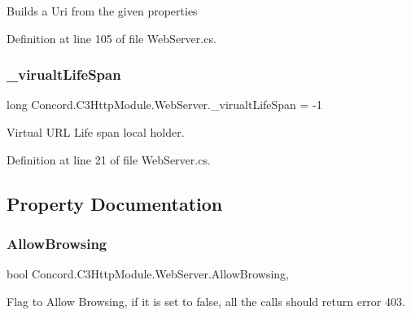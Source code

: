 Builds a Uri from the given properties 



Definition at line 105 of file Web\+Server.\+cs.

\mbox{\label{class_concord_1_1_c3_http_module_1_1_web_server_adbb7b3ec87d6021801930c29b21e6ef5}} 
\subsubsection{\texorpdfstring{\_virualtLifeSpan}{\_virualtLifeSpan}}
{\footnotesize\ttfamily long Concord.\+C3\+Http\+Module.\+Web\+Server.\+\_\+virualt\+Life\+Span = -\/1\hspace{0.3cm}{\ttfamily [private]}}



Virtual U\+RL Life span local holder. 



Definition at line 21 of file Web\+Server.\+cs.



\subsection{Property Documentation}
\mbox{\label{class_concord_1_1_c3_http_module_1_1_web_server_ac38109b56ad34adee4a2a538c4101c98}} 
\subsubsection{\texorpdfstring{AllowBrowsing}{AllowBrowsing}}
{\footnotesize\ttfamily bool Concord.\+C3\+Http\+Module.\+Web\+Server.\+Allow\+Browsing\hspace{0.3cm}{\ttfamily [get]}, {\ttfamily [set]}}



Flag to Allow Browsing, if it is set to false, all the calls should return error 403. 



